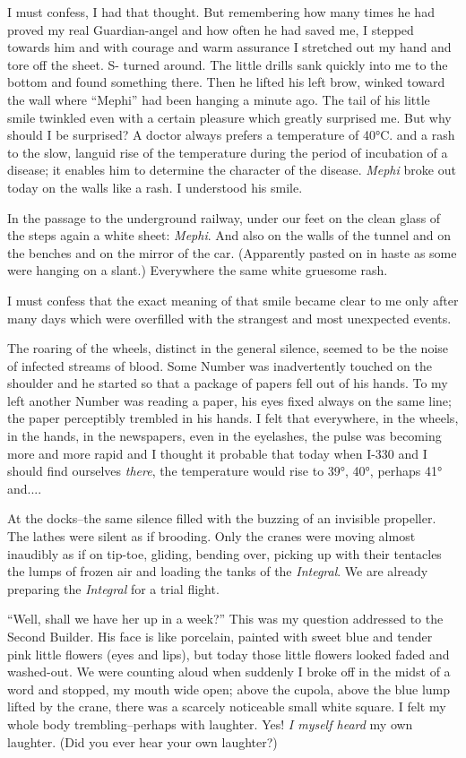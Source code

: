 \documentclass[11pt,openany]{book}
\begin{document}
I must confess, I had that thought. But remembering how many times he had proved my real Guardian-angel and how often he had saved me, I stepped towards him and with courage and warm assurance I stretched out my hand and tore off the sheet. S- turned around. The little drills sank quickly into me to the bottom and found something there. Then he lifted his left brow, winked toward the wall where ``Mephi'' had been hanging a minute ago. The tail of his little smile twinkled even with a certain pleasure which greatly surprised me. But why should I be surprised? A doctor always prefers a temperature of 40°C. and a rash to the slow, languid rise of the temperature during the period of incubation of a disease; it enables him to determine the character of the disease. \emph{Mephi} broke out today on the walls like a rash. I understood his smile.

In the passage to the underground railway, under our feet on the clean glass of the steps again a white sheet: \emph{Mephi}. And also on the walls of the tunnel and on the benches and on the mirror of the car. (Apparently pasted on in haste as some were hanging on a slant.) Everywhere the same white gruesome rash.

I must confess that the exact meaning of that smile became clear to me only after many days which were overfilled with the strangest and most unexpected events.

The roaring of the wheels, distinct in the general silence, seemed to be the noise of infected streams of blood. Some Number was inadvertently touched on the shoulder and he started so that a package of papers fell out of his hands. To my left another Number was reading a paper, his eyes fixed always on the same line; the paper perceptibly trembled in his hands. I felt that everywhere, in the wheels, in the hands, in the newspapers, even in the eyelashes, the pulse was becoming more and more rapid and I thought it probable that today when I-330 and I should find ourselves \emph{there}, the temperature would rise to 39°, 40°, perhaps 41° and....

At the docks--the same silence filled with the buzzing of an invisible propeller. The lathes were silent as if brooding. Only the cranes were moving almost inaudibly as if on tip-toe, gliding, bending over, picking up with their tentacles the lumps of frozen air and loading the tanks of the \emph{Integral}. We are already preparing the \emph{Integral} for a trial flight.

``Well, shall we have her up in a week?'' This was my question addressed to the Second Builder. His face is like porcelain, painted with sweet blue and tender pink little flowers (eyes and lips), but today those little flowers looked faded and washed-out. We were counting aloud when suddenly I broke off in the midst of a word and stopped, my mouth wide open; above the cupola, above the blue lump lifted by the crane, there was a scarcely noticeable small white square. I felt my whole body trembling--perhaps with laughter. Yes! \emph{I myself heard} my own laughter. (Did you ever hear your own laughter?)
\end{document}
